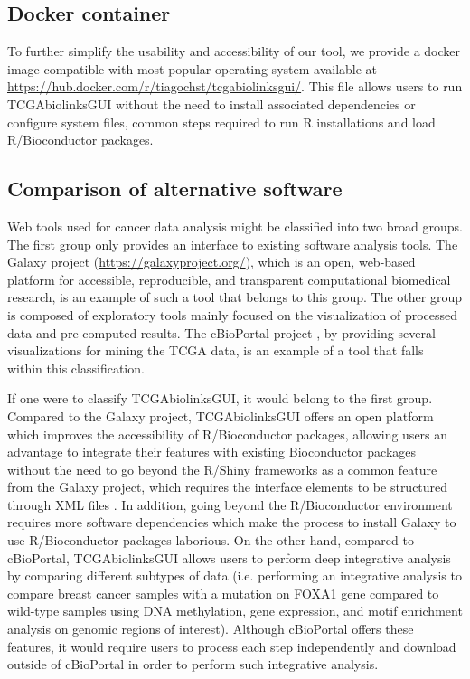 \subsection{Docker container}
To further simplify the usability and accessibility of our tool, we provide a docker image compatible with most popular operating system available at \\
\href{https://hub.docker.com/r/tiagochst/tcgabiolinksgui/}{https://hub.docker.com/r/tiagochst/tcgabiolinksgui/}. This file allows users to run TCGAbiolinksGUI without the need to install associated dependencies or configure system files, common steps required to run R installations and load R/Bioconductor packages. 

\subsection{Comparison of alternative software}

Web tools used for cancer data analysis might be classified into two broad groups. 
The first group only provides an interface to existing software analysis tools.
The Galaxy project (\href{https://galaxyproject.org/}{https://galaxyproject.org/}), which is an open, web-based platform for accessible, reproducible, and transparent computational biomedical research, is an example of such a tool that belongs to this group.
The other group is composed of exploratory tools mainly focused on the visualization of processed data and pre-computed results. The cBioPortal project \cite{gao2013integrative,cerami2012cbio}, by providing several visualizations for mining the TCGA data, is an example of a tool that falls within this classification.

 If one were to classify TCGAbiolinksGUI, it would belong to the first group. Compared to the Galaxy project, TCGAbiolinksGUI offers an open platform which improves the accessibility of R/Bioconductor packages, allowing users an advantage to integrate their features with existing Bioconductor packages without the need to go beyond the R/Shiny frameworks as a common feature from the Galaxy project, which requires the interface elements to be structured through XML files \cite{10.12688/f1000research.9821.1}. 
In addition, going beyond the R/Bioconductor environment requires more software dependencies which make the process to install Galaxy to use R/Bioconductor packages laborious.
On the other hand, compared to cBioPortal, TCGAbiolinksGUI allows users to perform deep integrative analysis by comparing different subtypes of data (i.e. performing an integrative analysis to compare breast cancer samples with a mutation on FOXA1 gene compared to wild-type samples using DNA methylation, gene expression, and motif enrichment analysis on genomic regions of interest). Although cBioPortal offers these features, it would require users to process each step independently and download outside of cBioPortal in order to perform such integrative analysis.


